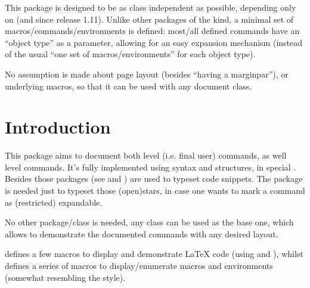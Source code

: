 \documentclass{article}
\begin{document}

  
\begin{typesetabstract}

This package is designed to be as class independent as possible, depending only on  (and  since release 1.11). Unlike other packages of the kind, a minimal set of macros/commands/environments is defined: most/all defined commands have an ``object type'' as a  parameter, allowing for an easy expansion mechanism (instead of the usual ``one set of macros/environments'' for each object type).

No assumption is made about page layout (besides ``having a marginpar''),  or underlying macros, so that it can be used with any document class.

\end{typesetabstract}

\tableofcontents

\section{Introduction}


This package aims to document both  level (i.e. final user) commands, as well  level commands. It's fully implemented using  syntax and structures, in special . Besides those  packages (see \cite{SCONTENTS} and \cite{listings}) are used to typeset code snippets. The package  is needed just to typeset those (open)stars, in case one wants to mark a command as (restricted) expandable.
 
 
No other package/class is needed, any class can be used as the base one, which allows to demonstrate the documented commands with any desired layout.

 defines a few macros to display and demonstrate \LaTeX{} code (using  and ), whilst  defines a series of macros to display/enumerate macros and environments (somewhat resembling the  style).
\end{document}
